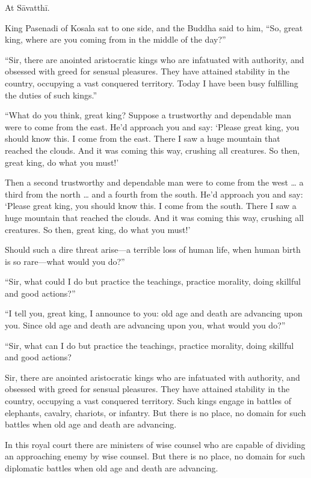 \documentclass[12pt,openany]{book}%
\begin{document}
At \textsanskrit{Sāvatthī}. 

King Pasenadi of Kosala sat to one side, and the Buddha said to him, “So, great king, where are you coming from in the middle of the day?” 

“Sir, there are anointed aristocratic kings who are infatuated with authority, and obsessed with greed for sensual pleasures. They have attained stability in the country, occupying a vast conquered territory. Today I have been busy fulfilling the duties of such kings.” 

“What do you think, great king? Suppose a trustworthy and dependable man were to come from the east. He’d approach you and say: ‘Please great king, you should know this. I come from the east. There I saw a huge mountain that reached the clouds. And it was coming this way, crushing all creatures. So then, great king, do what you must!’ 

Then a second trustworthy and dependable man were to come from the west … a third from the north … and a fourth from the south. He’d approach you and say: ‘Please great king, you should know this. I come from the south. There I saw a huge mountain that reached the clouds. And it was coming this way, crushing all creatures. So then, great king, do what you must!’ 

Should such a dire threat arise—a terrible loss of human life, when human birth is so rare—what would you do?” 

“Sir, what could I do but practice the teachings, practice morality, doing skillful and good actions?” 

“I tell you, great king, I announce to you: old age and death are advancing upon you. Since old age and death are advancing upon you, what would you do?” 

“Sir, what can I do but practice the teachings, practice morality, doing skillful and good actions? 

Sir, there are anointed aristocratic kings who are infatuated with authority, and obsessed with greed for sensual pleasures. They have attained stability in the country, occupying a vast conquered territory. Such kings engage in battles of elephants, cavalry, chariots, or infantry. But there is no place, no domain for such battles when old age and death are advancing. 

In this royal court there are ministers of wise counsel who are capable of dividing an approaching enemy by wise counsel. But there is no place, no domain for such diplomatic battles when old age and death are advancing. 
\end{document}
